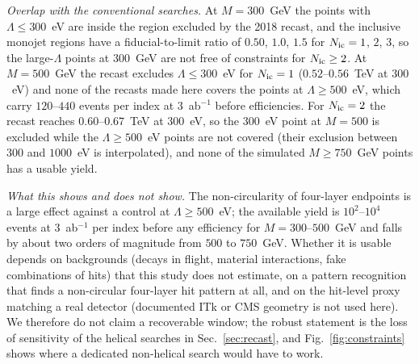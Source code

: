 \documentclass[prd,twocolumn,nofootinbib,superscriptaddress,amsmath,amssymb]{revtex4-2}
\begin{document}
\emph{Overlap with the conventional searches.} At $M=300$~GeV the points with $\Lambda\le300$~eV are inside the region excluded by the 2018 recast, and the inclusive monojet regions have a fiducial-to-limit ratio of $0.50$, $1.0$, $1.5$ for $N_{\rm ic}=1$, $2$, $3$, so the large-$\Lambda$ points at $300$~GeV are not free of constraints for $N_{\rm ic}\ge2$. At $M=500$~GeV the recast excludes $\Lambda\le300$~eV for $N_{\rm ic}=1$ ($0.52$--$0.56$~TeV at $300$~eV) and none of the recasts made here covers the points at $\Lambda\ge500$~eV, which carry $120$--$440$ events per index at $3$~ab$^{-1}$ before efficiencies. For $N_{\rm ic}=2$ the recast reaches $0.60$--$0.67$~TeV at $300$~eV, so the $300$~eV point at $M=500$ is excluded while the $\Lambda\ge500$~eV points are not covered (their exclusion between $300$ and $1000$~eV is interpolated), and none of the simulated $M\ge750$~GeV points has a usable yield.

\emph{What this shows and does not show.} The non-circularity of four-layer endpoints is a large effect against a control at $\Lambda\ge500$~eV; the available yield is $10^2$--$10^4$ events at $3$~ab$^{-1}$ per index before any efficiency for $M=300$--$500$~GeV and falls by about two orders of magnitude from $500$ to $750$~GeV. Whether it is usable depends on backgrounds (decays in flight, material interactions, fake combinations of hits) that this study does not estimate, on a pattern recognition that finds a non-circular four-layer hit pattern at all, and on the hit-level proxy matching a real detector (documented ITk or CMS geometry is not used here). We therefore do not claim a recoverable window; the robust statement is the loss of sensitivity of the helical searches in Sec.~\ref{sec:recast}, and Fig.~\ref{fig:constraints} shows where a dedicated non-helical search would have to work.
\end{document}
